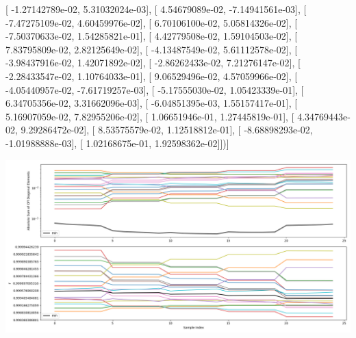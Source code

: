 \documentclass{article}
\begin{document}
       [ -1.27142789e-02,   5.31032024e-03],
       [  4.54679089e-02,  -7.14941561e-03],
       [ -7.47275109e-02,   4.60459976e-02],
       [  6.70106100e-02,   5.05814326e-02],
       [ -7.50370633e-02,   1.54285821e-01],
       [  4.42779508e-02,   1.59104503e-02],
       [  7.83795809e-02,   2.82125649e-02],
       [ -4.13487549e-02,   5.61112578e-02],
       [ -3.98437916e-02,   1.42071892e-02],
       [ -2.86262433e-02,   7.21276147e-02],
       [ -2.28433547e-02,   1.10764033e-01],
       [  9.06529496e-02,   4.57059966e-02],
       [ -4.05440957e-02,  -7.61719257e-03],
       [ -5.17555030e-02,   1.05423339e-01],
       [  6.34705356e-02,   3.31662096e-03],
       [ -6.04851395e-03,   1.55157417e-01],
       [  5.16907059e-02,   7.82955206e-02],
       [  1.06651946e-01,   1.27445819e-01],
       [  4.34769443e-02,   9.29286472e-02],
       [  8.53575579e-02,   1.12518812e-01],
       [ -8.68898293e-02,  -1.01988888e-03],
       [  1.02168675e-01,   1.92598362e-02]])]
\begin{center}
\includegraphics[scale=.9]{report_pickled_controls214/control_dpn_all.png}

\end{center}
\end{document}

